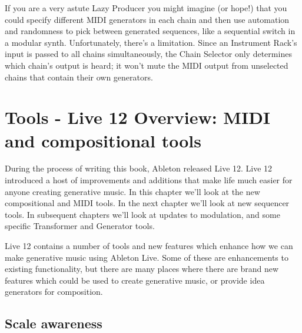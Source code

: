 \documentclass[
  12pt,
  letterpaper,
  oneside,
  open=any]{scrbook}
\begin{document}
If you are a very astute Lazy Producer you might imagine (or hope!) that
you could specify different MIDI generators in each chain and then use
automation and randomness to pick between generated sequences, like a
sequential switch in a modular synth. Unfortunately, there's a
limitation. Since an Instrument Rack's input is passed to all chains
simultaneously, the Chain Selector only determines which chain's output
is heard; it won't mute the MIDI output from unselected chains that
contain their own generators.


\chapter{Tools - Live 12 Overview: MIDI and compositional
tools}\label{Chapter-030-Tools-Live12_Intro}

During the process of writing this book, Ableton released Live 12. Live
12 introduced a host of improvements and additions that make life much
easier for anyone creating generative music. In this chapter we'll look
at the new compositional and MIDI tools. In the next chapter we'll look
at new sequencer tools. In subsequent chapters we'll look at updates to
modulation, and some specific Transformer and Generator tools.

\begin{tcolorbox}[enhanced jigsaw, breakable, left=2mm, leftrule=.75mm, toprule=.15mm, opacitybacktitle=0.6, toptitle=1mm, coltitle=black, colback=white, colbacktitle=quarto-callout-tip-color!10!white, opacityback=0, rightrule=.15mm, bottomrule=.15mm, titlerule=0mm, title=\textcolor{quarto-callout-tip-color}{\faLightbulb}\hspace{0.5em}{Key idea}, arc=.35mm, bottomtitle=1mm, colframe=quarto-callout-tip-color-frame]

Live 12 contains a number of tools and new features which enhance how we
can make generative music using Ableton Live. Some of these are
enhancements to existing functionality, but there are many places where
there are brand new features which could be used to create generative
music, or provide idea generators for composition.

\end{tcolorbox}

\section{Scale awareness}\label{scale-awareness}
\end{document}
